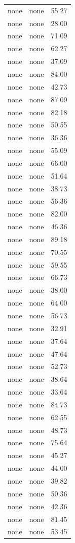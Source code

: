 \begin{tabular}{rrr}
none & none & 55.27 \\
none & none & 28.00 \\
none & none & 71.09 \\
none & none & 62.27 \\
none & none & 37.09 \\
none & none & 84.00 \\
none & none & 42.73 \\
none & none & 87.09 \\
none & none & 82.18 \\
none & none & 50.55 \\
none & none & 36.36 \\
none & none & 55.09 \\
none & none & 66.00 \\
none & none & 51.64 \\
none & none & 38.73 \\
none & none & 56.36 \\
none & none & 82.00 \\
none & none & 46.36 \\
none & none & 89.18 \\
none & none & 70.55 \\
none & none & 59.55 \\
none & none & 66.73 \\
none & none & 38.00 \\
none & none & 64.00 \\
none & none & 56.73 \\
none & none & 32.91 \\
none & none & 37.64 \\
none & none & 47.64 \\
none & none & 52.73 \\
none & none & 38.64 \\
none & none & 33.64 \\
none & none & 84.73 \\
none & none & 62.55 \\
none & none & 48.73 \\
none & none & 75.64 \\
none & none & 45.27 \\
none & none & 44.00 \\
none & none & 39.82 \\
none & none & 50.36 \\
none & none & 42.36 \\
none & none & 81.45 \\
none & none & 53.45 \\

\end{tabular}
